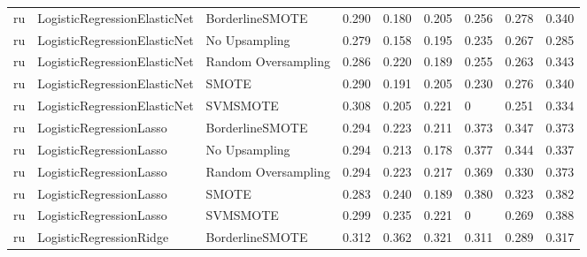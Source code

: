 \begin{tabular}{lllllllll}
      ru & LogisticRegressionElasticNet &     BorderlineSMOTE & 0.290 &                     0.180 &                 0.205 &                  0.256 &                                   0.278 &     0.340 \\
      ru & LogisticRegressionElasticNet &       No Upsampling & 0.279 &                     0.158 &                 0.195 &                  0.235 &                                   0.267 &     0.285 \\
      ru & LogisticRegressionElasticNet & Random Oversampling & 0.286 &                     0.220 &                 0.189 &                  0.255 &                                   0.263 &     0.343 \\
      ru & LogisticRegressionElasticNet &               SMOTE & 0.290 &                     0.191 &                 0.205 &                  0.230 &                                   0.276 &     0.340 \\
      ru & LogisticRegressionElasticNet &            SVMSMOTE & 0.308 &                     0.205 &                 0.221 &                      0 &                                   0.251 &     0.334 \\
      ru &      LogisticRegressionLasso &     BorderlineSMOTE & 0.294 &                     0.223 &                 0.211 &                  0.373 &                                   0.347 &     0.373 \\
      ru &      LogisticRegressionLasso &       No Upsampling & 0.294 &                     0.213 &                 0.178 &                  0.377 &                                   0.344 &     0.337 \\
      ru &      LogisticRegressionLasso & Random Oversampling & 0.294 &                     0.223 &                 0.217 &                  0.369 &                                   0.330 &     0.373 \\
      ru &      LogisticRegressionLasso &               SMOTE & 0.283 &                     0.240 &                 0.189 &                  0.380 &                                   0.323 &     0.382 \\
      ru &      LogisticRegressionLasso &            SVMSMOTE & 0.299 &                     0.235 &                 0.221 &                      0 &                                   0.269 &     0.388 \\
      ru &      LogisticRegressionRidge &     BorderlineSMOTE & 0.312 &                     0.362 &                 0.321 &                  0.311 &                                   0.289 &     0.317 \\

\end{tabular}
